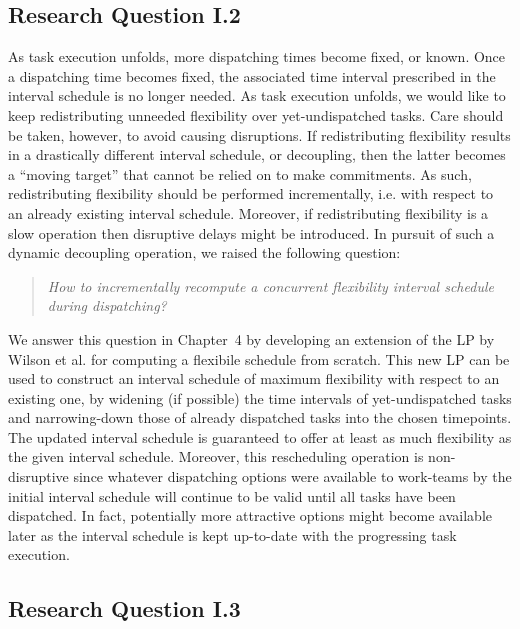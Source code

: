 \subsection{Research Question I.2}

	As task execution unfolds, more dispatching times become fixed, or known.
	Once a dispatching time becomes fixed, the associated time interval prescribed in the interval schedule is no longer needed.
	As task execution unfolds, we would like to keep redistributing unneeded flexibility over yet-undispatched tasks.
	Care should be taken, however, to avoid causing disruptions.
	If redistributing flexibility results in a drastically different interval schedule, or decoupling,
	then the latter becomes a ``moving target'' that cannot be relied on to make commitments.
	As such, redistributing flexibility should be performed incrementally,
	i.e. with respect to an already existing interval schedule.	
	Moreover, if redistributing flexibility is a slow operation then disruptive delays might be introduced.
	In pursuit of such a dynamic decoupling operation, we raised the following question: 

	\begin{quote}
	\emph{How to incrementally recompute a concurrent flexibility interval schedule during dispatching?}
	\end{quote}

	We answer this question in Chapter~4 by developing an extension of the LP by Wilson et al. for computing a flexibile schedule from scratch.
	This new LP can be used to construct an interval schedule of maximum flexibility with respect to an existing one,
	by widening (if possible) the time intervals of yet-undispatched tasks and narrowing-down those of already dispatched tasks into the chosen timepoints.
	The updated interval schedule is guaranteed to offer at least as much flexibility as the given interval schedule.
	Moreover, this rescheduling operation is non-disruptive since
	whatever dispatching options were available to work-teams by the initial interval schedule 
	will continue to be valid until all tasks have been dispatched.
	In fact, potentially more attractive options might become available later
	as the interval schedule is kept up-to-date with the progressing task execution.

\subsection{Research Question I.3}
	
